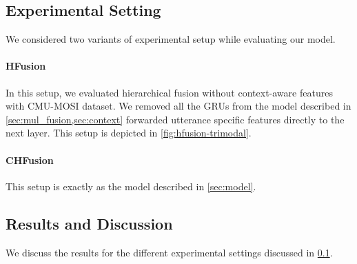 \documentclass[review]{elsarticle}
\newcommand\?[1]{\hl{#1}}
\begin{document}
\subsection{Experimental Setting}
\label{sec:exp_set}

We considered two variants of experimental setup while evaluating our model.

\paragraph{HFusion} In this setup, we evaluated hierarchical fusion
without context-aware features with CMU-MOSI dataset. We removed all the GRUs
from the model described in \cref{sec:mul_fusion,sec:context} forwarded
utterance specific features directly to the next layer. This setup is depicted
in \cref{fig:hfusion-trimodal}. 

\paragraph{CHFusion} This setup is exactly as the model described in
\cref{sec:model}.

\subsection{Results and Discussion}

We discuss the results for the different experimental settings discussed in
\cref{sec:exp_set}.
\end{document}

